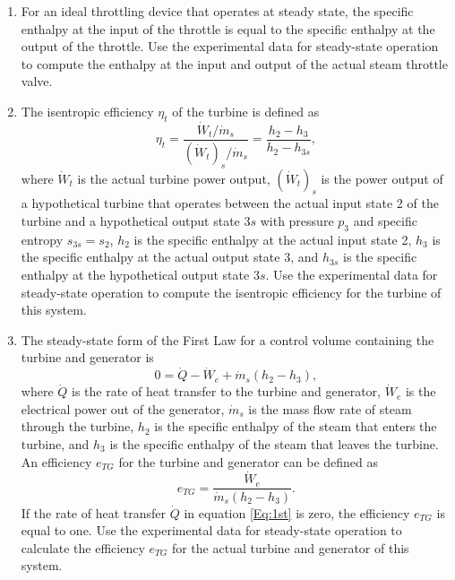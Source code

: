 \documentclass[12pt]{article}
\begin{document}
\begin{enumerate}

\item For an ideal throttling device that operates at steady state,
the specific enthalpy at the input of the throttle is equal to 
the specific enthalpy 
at the output of the throttle.  Use the experimental data 
for steady-state operation to compute
the enthalpy at the input and output of the actual steam throttle
valve.  

\item The isentropic efficiency $\eta_{t}$ of the turbine is defined
as 
\begin{equation}
\label{Eq:Effic}
\eta_{t} = \frac{\dot{W}_{t}/\dot{m}_{s}}
{(\dot{W}_{t})_{s}/\dot{m}_{s}} = 
\frac{h_{2} - h_{3}}{h_{2} - h_{3s}}, 
\end{equation}
where $\dot{W}_{t}$ is the actual turbine power output, 
$(\dot{W}_{t})_{s}$ is the power output of a hypothetical turbine 
that operates between the actual input state 2 of the turbine
and a hypothetical output state $3s$ with pressure $p_{3}$ and 
specific entropy $s_{3s} = s_{2}$, $h_{2}$ is the specific enthalpy 
at the actual input state 2, $h_{3}$ is the specific enthalpy 
at the actual output state 3, and $h_{3s}$ is the specific enthalpy 
at the hypothetical output state $3s$.  Use the experimental
data for steady-state operation to compute the isentropic efficiency 
for the turbine of this system.  

\item The steady-state form of the First Law for a control
volume containing the turbine and generator is 
\begin{equation} 
0 = \dot{Q} - \dot{W}_{e} + \dot{m}_{s}(h_{2} - h_{3}),
\label{Eq:1st}
\end{equation}
where $\dot{Q}$ is the rate of heat transfer to the 
turbine and generator, $\dot{W}_{e}$ is the electrical power 
out of the generator, $\dot{m}_{s}$ is the mass flow rate of 
steam through the turbine, $h_{2}$ is the specific enthalpy of the steam
that enters the turbine, and $h_{3}$ is the specific enthalpy
of the steam that leaves the turbine.  An efficiency $e_{TG}$
for the turbine and generator can be defined as
\begin{equation}
e_{TG} = \frac{\dot{W}_e}{\dot{m}_{s}(h_{2} - h_{3})}.
\end{equation}
If the rate of heat transfer $\dot{Q}$ in equation \ref{Eq:1st} is zero,
the efficiency $e_{TG}$ is equal to one.  Use the experimental
data for steady-state operation to calculate the efficiency 
$e_{TG}$ for the actual turbine and generator of this system.


\end{enumerate}
\end{document}

